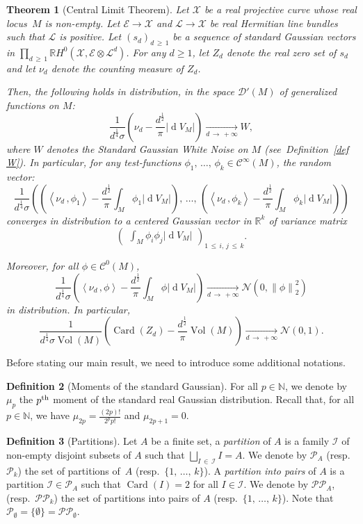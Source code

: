 \documentclass[10pt]{amsart}
\newtheorem{theo}{Theorem}[section]
\theoremstyle{definition}\newtheorem{defi}[theo]{Definition}\newtheorem{rema}[theo]{Remark}\newtheorem{exam}[theo]{Example}\newtheorem{exem}[theo]{Example}\newtheorem{nota}[theo]{Notation}
\DeclareMathOperator{\card}{Card}
\DeclareMathOperator{\dmesure}{d}
\DeclareMathOperator{\Vol}{Vol}
\newcommand{\D}{\mathcal{D}}
\newcommand{\E}{\mathcal{E}}
\newcommand{\I}{\mathcal{I}}
\newcommand{\X}{\mathcal{X}}
\renewcommand{\L}{\mathcal{L}}
\newcommand{\clN}{\mathcal{N}}
\newcommand{\clC}{\mathcal{C}}
\newcommand{\pa}{\mathcal{P}\!}
\newcommand{\pp}{\mathcal{P\!P}\!}
\newcommand{\N}{\mathbb{N}}
\newcommand{\R}{\mathbb{R}}
\newcommand{\norm}[1]{\left\lvert #1 \right\rvert}
\newcommand{\Norm}[1]{\left\lVert #1 \right\rVert}
\newcommand{\prsc}[2]{\left\langle #1\,, #2 \right\rangle}
\newcommand{\rmes}[1]{\norm{\dmesure\! V_{#1}}}
\newcommand{\vol}[1]{\Vol\!\left(#1\right)}
\renewcommand{\H}{H^0(\X,\E \otimes \L^d)}
\renewcommand{\geq}{\geqslant}
\renewcommand{\leq}{\leqslant}
\begin{document}
\begin{theo}[{Central Limit Theorem}]\label{thm central limit theorem}
Let $\X$ be a real projective curve whose real locus~$M$ is non-empty. Let $\E \to \X$ and $\L \to \X$ be real Hermitian line bundles such that $\L$ is positive. Let $(s_d)_{d\,\geq\,1}$ be a sequence of standard Gaussian vectors in $\prod_{d \,\geq\,1}\R \H$. For any $d \geq 1$, let $Z_d$ denote the real zero set of $s_d$ and let $\nu_d$ denote the counting measure of $Z_d$.

Then, the following holds in distribution, in the space $\D'(M)$ of generalized functions on $M$:
\[
\frac{1}{d^\frac{1}{4}\sigma}\left(\nu_d - \frac{d^\frac{1}{2}}{\pi}\rmes{M}\right) \xrightarrow[d\,\to\,+\infty]{} W,
\]
where $W$ denotes the Standard Gaussian White Noise on $M$ (see~Definition~\ref{def W}). In particular, for any test-functions $\phi_1,\,\dots,\,\phi_k \in \clC^\infty(M)$, the random vector:
\[
\frac{1}{d^\frac{1}{4}\sigma}\left(\left(\prsc{\nu_d}{\phi_1} - \frac{d^\frac{1}{2}}{\pi}\int_M \phi_1\rmes{M}\right),\,\dots,\, \left(\prsc{\nu_d}{\phi_k} - \frac{d^\frac{1}{2}}{\pi}\int_M \phi_k\rmes{M}\right)\right)
\]
converges in distribution to a centered Gaussian vector in $\R^k$ of variance matrix 
\[
\begin{pmatrix}
\displaystyle\int_M \phi_i \phi_j \rmes{M}
\end{pmatrix}_{1\,\leq\,i,\,j\,\leq\,k}.
\]

Moreover, for all $\phi \in \clC^0(M)$,
\[
\frac{1}{d^\frac{1}{4}\sigma}\left(\prsc{\nu_d}{\phi} - \frac{d^\frac{1}{2}}{\pi}\int_M \phi\rmes{M}\right) \xrightarrow[d\,\to\,+\infty]{} \clN\left(0,\Norm{\phi}_2^2\right)
\]
in distribution. In particular,
\[
\frac{1}{d^\frac{1}{4}\sigma\vol{M}}\left(\card(Z_d) - \frac{d^\frac{1}{2}}{\pi} \vol{M}\right) \xrightarrow[d\,\to\,+\infty]{} \clN(0,1).
\]
\end{theo}

Before stating our main result, we need to introduce some additional notations.

\begin{defi}[{Moments of the standard Gaussian}]\label{def mu p}
For all $p \in \N$, we denote by $\mu_p$ the $p^{\rm th}$ moment of the standard real Gaussian distribution. Recall that, for all $p \in \N$, we have $\mu_{2p} = \frac{(2p)!}{2^p p!}$ and $\mu_{2p+1}=0$.
\end{defi}

\begin{defi}[{Partitions}]\label{def partitions}
Let $A$ be a finite set, a \emph{partition} of $A$ is a family $\I$ of non-empty disjoint subsets of $A$ such that $\bigsqcup_{I\,\in\,\I} I =A$. We denote by $\pa_A$ (resp.~$\pa_k$) the set of partitions of~$A$ (resp.~$\{1,\,\dots,\,k\}$). A \emph{partition into pairs} of $A$ is a partition $\I \in \pa_A$ such that $\card(I)=2$ for all $I \in \I$. We denote by $\pp_A$, (resp.~$\pp_k$) the set of partitions into pairs of $A$ (resp.~$\{1,\,\dots,\,k\}$). Note that $\pa_\emptyset = \{ \emptyset \} = \pp_\emptyset$.
\end{defi}
\end{document}
